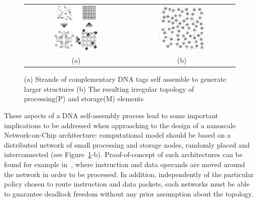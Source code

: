 \begin{figure}
\centering
\begin{tabular}{cc}
    \includegraphics[width=0.45\textwidth]{pictures/dna2b.eps} &
    \includegraphics[width=0.45\textwidth]{pictures/dna1_complex2.eps} \\
 (a) & (b)
 \end{tabular}
  \caption{(a) Strands of complementary DNA tags self assemble to
  generate larger structures (b) The resulting irregular topology of
  processing(P) and storage(M) elements }
  \label{fig:nana}
\end{figure}
These aspects of a DNA self-assembly process lead to some important
implications to be addressed when approaching to the design of
a nanoscale Network-on-Chip architecture: computational model should be based on a
distributed network of small processing and storage nodes, randomly
placed and interconnected (see Figure~\ref{fig:nana}-b).
Proof-of-concept of such architectures can be found for
example in~\cite{patwardhan2006_1}, where instruction and data
operands are moved around the network in order to be processed.
In addition, independently of the particular policy chosen to route instruction and
data packets, such networks must be able to guarantee deadlock freedom without any
prior assumption about the topology.

